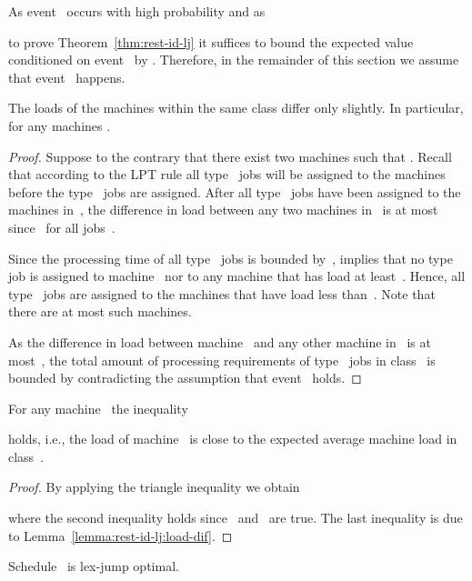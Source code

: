 \documentclass[a4paper,11pt,fleqn]{article}
\begin{document}
As event~ occurs with high probability and as

to prove Theorem~\ref{thm:rest-id-lj} it suffices to bound the expected value conditioned on event~ by . Therefore, in the remainder of this section we assume that event~ happens.

\begin{lemma}
\label{lemma:rest-id-lj:load-dif}
The loads of the machines within the same class differ only slightly. In particular,  for any machines .
\end{lemma}

\begin{proof}
Suppose to the contrary that there exist two machines 
such that . Recall that according to the LPT rule all type~ jobs will be assigned to the machines before the type~ jobs are assigned. After all type~ jobs  have been assigned to the machines in~, the difference in load between any two machines in~ is at most~ since~ for all jobs~.

Since the processing time of all type~ jobs is bounded by~,  implies that  no type~ job is assigned to machine~ nor to any machine that has load at least~. Hence, all type~ jobs are assigned to the machines that have load less than~. Note that there are at most  such machines.

As the difference in load between machine~ and any other machine in~ is
at most~, the total amount of processing requirements of type~ jobs in
class~ is bounded by 
contradicting the assumption that event~ holds.
\end{proof}

\begin{lemma}
\label{lemma:rest-id-lj:load}
For any machine~ the inequality

holds, i.e., the load of machine~ is close to the expected average machine load in class~.
\end{lemma}

\begin{proof}
By applying the triangle inequality we obtain

where the second inequality holds since~ and~ are true. The last inequality is due to Lemma~\ref{lemma:rest-id-lj:load-dif}.
\end{proof}

\begin{lemma}
\label{lem:rest-id-lj:lexjumpopt2}
Schedule~ is lex-jump optimal.\end{lemma}
\end{document}
